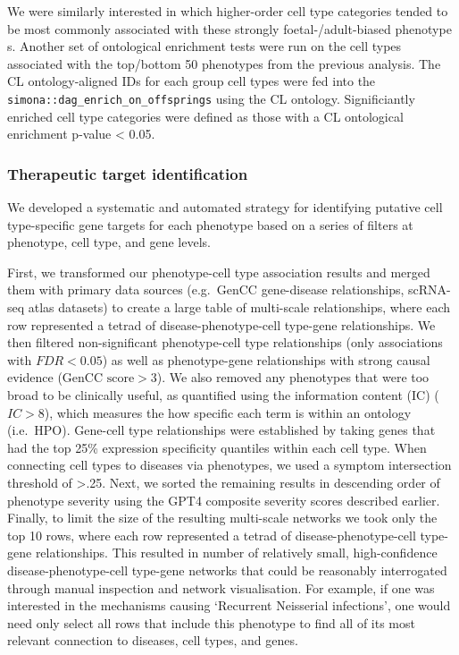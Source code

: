 \documentclass[
]{article}
\begin{document}
We were similarly interested in which higher-order cell type categories
tended to be most commonly associated with these strongly
foetal-/adult-biased phenotype s. Another set of ontological enrichment
tests were run on the cell types associated with the top/bottom 50
phenotypes from the previous analysis. The CL ontology-aligned IDs for
each group cell types were fed into the
\texttt{simona::dag\_enrich\_on\_offsprings} using the CL ontology.
Significiantly enriched cell type categories were defined as those with
a CL ontological enrichment p-value \textless{} 0.05.

\subsubsection{Therapeutic target
identification}\label{therapeutic-target-identification-1}

We developed a systematic and automated strategy for identifying
putative cell type-specific gene targets for each phenotype based on a
series of filters at phenotype, cell type, and gene levels.

First, we transformed our phenotype-cell type association results and
merged them with primary data sources (e.g.~GenCC gene-disease
relationships, scRNA-seq atlas datasets) to create a large table of
multi-scale relationships, where each row represented a tetrad of
disease-phenotype-cell type-gene relationships. We then filtered
non-significant phenotype-cell type relationships (only associations
with \(FDR<0.05\)) as well as phenotype-gene relationships with strong
causal evidence (\(\text{GenCC score}>3\)). We also removed any
phenotypes that were too broad to be clinically useful, as quantified
using the information content (IC) (\(IC>8\)), which measures the how
specific each term is within an ontology (i.e.~HPO). Gene-cell type
relationships were established by taking genes that had the top 25\%
expression specificity quantiles within each cell type. When connecting
cell types to diseases via phenotypes, we used a symptom intersection
threshold of \textgreater.25. Next, we sorted the remaining results in
descending order of phenotype severity using the GPT4 composite severity
scores described earlier. Finally, to limit the size of the resulting
multi-scale networks we took only the top 10 rows, where each row
represented a tetrad of disease-phenotype-cell type-gene relationships.
This resulted in number of relatively small, high-confidence
disease-phenotype-cell type-gene networks that could be reasonably
interrogated through manual inspection and network visualisation. For
example, if one was interested in the mechanisms causing `Recurrent
Neisserial infections', one would need only select all rows that include
this phenotype to find all of its most relevant connection to diseases,
cell types, and genes.
\end{document}
